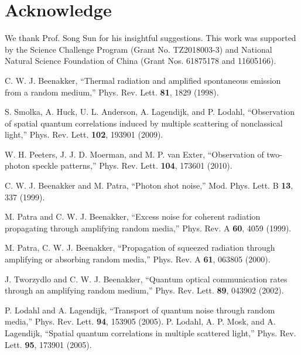 \documentclass[9pt,twocolumn,twoside]{osajnl}
\begin{document}
\section{Acknowledge}
We thank Prof. Song Sun for his insightful suggestions. This work was supported by the Science Challenge Program (Grant No. TZ2018003-3) and National Natural Science Foundation of China (Grant Nos. 61875178 and 11605166).




%
\begin{thebibliography}{99}
\newcommand{\enquote}[1]{``#1''}

 C. W. J. Beenakker, \enquote{Thermal radiation and amplified spontaneous emission from a random medium,} Phys. Rev. Lett. \textbf{81}, 1829 (1998). 

 S. Smolka, A. Huck, U. L. Anderson, A. Lagendijk, and P. Lodahl, \enquote{Observation of spatial quantum correlations induced by multiple scattering of nonclassical light,} Phys. Rev. Lett. \textbf{102}, 193901 (2009).

 W. H. Peeters, J. J. D. Moerman, and M. P. van Exter, \enquote{Observation of two-photon speckle patterns,} Phys. Rev. Lett. \textbf{104}, 173601 (2010).


 C. W. J. Beenakker and M. Patra, \enquote{Photon shot noise,} Mod. Phys. Lett. B \textbf{13}, 337 (1999). 

 M. Patra and C. W. J. Beenakker, \enquote{Excess noise for coherent radiation propagating through amplifying random media,} Phys. Rev. A \textbf{60}, 4059 (1999).

 M. Patra, C. W. J. Beenakker, \enquote{Propagation of squeezed radiation through amplifying or absorbing random media,} Phys. Rev. A \textbf{61}, 063805 (2000). 

 J. Tworzydlo and C. W. J. Beenakker, \enquote{Quantum optical communication rates through an amplifying random medium,} Phys. Rev. Lett. \textbf{89}, 043902 (2002).

 P. Lodahl and A. Lagendijk, \enquote{Transport of quantum noise through random media,} Phys. Rev. Lett. \textbf{94}, 153905 (2005).
 P. Lodahl, A. P. Mosk, and A. Lagendijk, \enquote{Spatial quantum correlations in multiple scattered light,} Phys. Rev. Lett. \textbf{95}, 173901 (2005).


\end{thebibliography}
\end{document}
